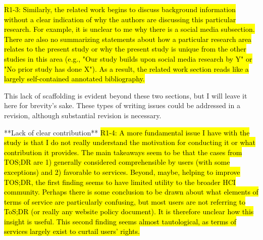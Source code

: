 \hl{R1-3: Similarly, the related work begins to discuss background information without a
clear indication of why the authors are discussing this particular
research. For example, it is unclear to me why there is a social media
subsection. There are also no summarizing statements about how a
particular research area relates to the present study or why the
present study is unique from the other studies in this area (e.g.,
"Our study builds upon social media research by Y" or "No prior study
has done X"). As a result, the related work section reads like a
largely self-contained annotated bibliography.}

This lack of scaffolding is evident beyond these two sections, but I will leave it
here for brevity's sake. These types of writing issues could be
addressed in a revision, although substantial revision is necessary.

**Lack of clear contribution**
\hl{R1-4: A more fundamental issue I have with the study is that I do not really understand
the motivation for conducting it or what contribution it provides. The
main takeaways seem to be that the cases from TOS;DR are 1) generally
considered comprehensible by users (with some exceptions) and 2)
favorable to services. Beyond, maybe, helping to improve TOS;DR, the
first finding seems to have limited utility to the broader HCI
community. Perhaps there is some conclusion to be drawn about what
elements of terms of service are particularly confusing, but most
users are not referring to ToS;DR (or really any website policy
document). It is therefore unclear how this insight is useful. This
second finding seems almost tautological, as terms of services largely
exist to curtail users' rights.}

